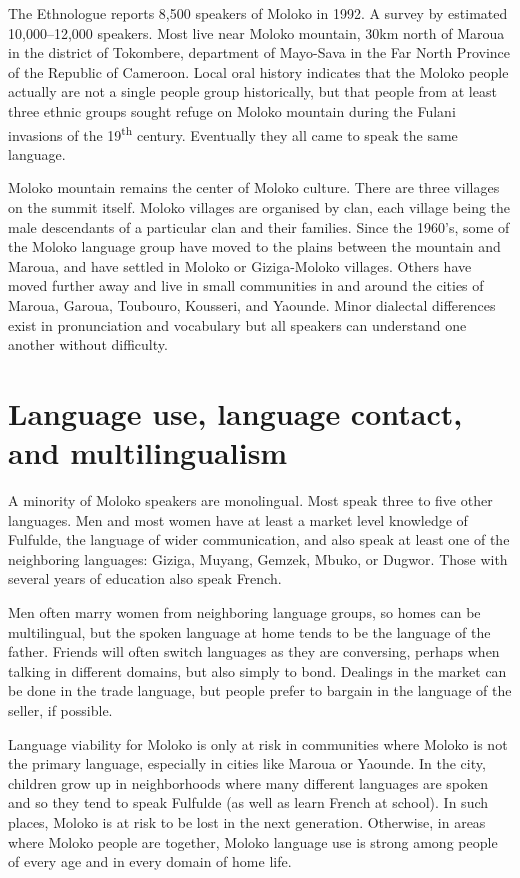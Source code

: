 The Ethnologue \citep{LewisSimonsFennig2009} reports 8,500 speakers of Moloko in 1992. A survey by \citet{Starr1997} estimated 10,000--12,000 speakers. Most live near Moloko mountain, 30km north of Maroua in the district of Tokombere, department of Mayo-Sava in the Far North Province of the Republic of Cameroon. Local oral history indicates that the Moloko people actually are not a single people group historically, but that people from at least three ethnic groups sought refuge on Moloko mountain during the Fulani invasions of the 19\textsuperscript{th} century. Eventually they all came to speak the same language. 

Moloko mountain remains the center of Moloko culture. There are three villages on the summit itself. Moloko villages are organised by clan, each village being the male descendants of a particular clan and their families. Since the 1960’s, some of the Moloko language group have moved to the plains between the mountain and Maroua, and have settled in Moloko or Giziga-Moloko villages. Others have moved further away and live in small communities in and around the cities of Maroua, Garoua, Toubouro, Kousseri, and Yaounde. Minor dialectal differences exist in pronunciation and vocabulary but all speakers can understand one another without difficulty.   

\section{Language use, language contact, and multilingualism}\label{sec:1.2}
\hypertarget{RefHeading1210281525720847}{}
A minority of Moloko speakers are monolingual.  Most  speak three to five other languages.  Men and most women have at least a market level knowledge of Fulfulde, the language of wider communication, and also speak at least one of the neighboring languages: Giziga, Muyang, Gemzek, Mbuko, or Dugwor.  Those with several years of education also speak French.  

Men often marry women from neighboring language groups, so homes can be multilingual, but the spoken language at home tends to be the language of the father.  Friends will often switch languages as they are conversing, perhaps when talking in different domains, but also simply to bond.  Dealings in the market can be done in the trade language, but people prefer to bargain in the language of the seller, if possible.  

Language viability for Moloko is only at risk in communities where Moloko is not the primary language, especially in cities like Maroua or Yaounde.  In the city, children grow up in neighborhoods where many different languages are spoken and so they tend to speak Fulfulde (as well as learn French at school).  In such places, Moloko is at risk to be lost in the next generation.  Otherwise, in areas where Moloko people are together, Moloko language use is strong among people of every age and in every domain of home life.

